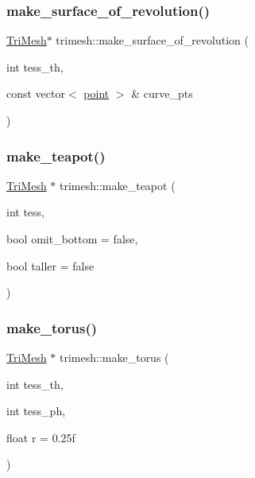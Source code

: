 \subsubsection{\texorpdfstring{make\+\_\+surface\+\_\+of\+\_\+revolution()}{make\_surface\_of\_revolution()}\hspace{0.1cm}{\footnotesize\ttfamily [2/2]}}
{\footnotesize\ttfamily \hyperlink{classtrimesh_1_1TriMesh}{Tri\+Mesh}$\ast$ trimesh\+::make\+\_\+surface\+\_\+of\+\_\+revolution (\begin{DoxyParamCaption}\item[{int}]{tess\+\_\+th,  }\item[{const vector$<$ \hyperlink{namespacetrimesh_a325b99fd6454b22fa4c4bc3223271b2c}{point} $>$ \&}]{curve\+\_\+pts }\end{DoxyParamCaption})}

\mbox{\label{namespacetrimesh_a1bda267d461f7e666805d7acfb40c8c9}} 
\subsubsection{\texorpdfstring{make\+\_\+teapot()}{make\_teapot()}}
{\footnotesize\ttfamily \hyperlink{classtrimesh_1_1TriMesh}{Tri\+Mesh} $\ast$ trimesh\+::make\+\_\+teapot (\begin{DoxyParamCaption}\item[{int}]{tess,  }\item[{bool}]{omit\+\_\+bottom = {\ttfamily false},  }\item[{bool}]{taller = {\ttfamily false} }\end{DoxyParamCaption})}

\mbox{\label{namespacetrimesh_a7352eb3e1eab4cbcaa32bf6c6ecd63d8}} 
\subsubsection{\texorpdfstring{make\+\_\+torus()}{make\_torus()}}
{\footnotesize\ttfamily \hyperlink{classtrimesh_1_1TriMesh}{Tri\+Mesh} $\ast$ trimesh\+::make\+\_\+torus (\begin{DoxyParamCaption}\item[{int}]{tess\+\_\+th,  }\item[{int}]{tess\+\_\+ph,  }\item[{float}]{r = {\ttfamily 0.25f} }\end{DoxyParamCaption})}

